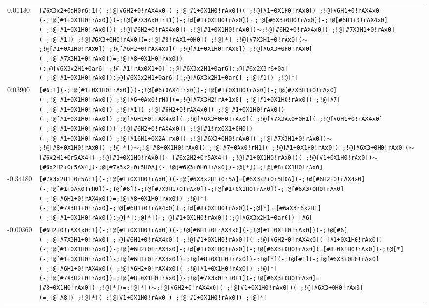 \begin{longtable}{>{\baselineskip=10pt}p{} >{\baselineskip=10pt}p{}}
0.01180 & \texttt{[\#6X3x2+0aH0r6:1](-;!@[\#6H2+0!rAX4x0](-;!@[\#1+0X1H0!rAx0])(-;!@[\#1+0X1H0!rAx0])-;!@[\#6H1+0!rAX4x0](-;!@[\#1+0X1H0!rAx0])(-;!@[\#7X3Ax0!rH1](-;!@[\#1+0X1H0!rAx0])$\sim$;!@[\#6X3+0H0!rAx0](-;!@[\#6H1+0!rAX4x0](-;!@[\#1+0X1H0!rAx0])(-;!@[\#6H2+0!rAX4x0](-;!@[\#1+0X1H0!rAx0])$\sim$;!@[\#6H2+0!rAX4x0])-;!@[\#7X3H1+0!rAx0](-;!@[\#1])-;!@[\#6X3+0H0!rAx0])=;!@[\#8!rAX1+0H0])-;!@[*]-;!@[\#7X3H1+0!rAx0]($\sim$;!@[\#1+0X1H0!rAx0])-;!@[\#6H2+0!rAX4x0](-;!@[\#1+0X1H0!rAx0])-;!@[\#6X3+0H0!rAx0](-;!@[\#7X3H1+0!rAx0])=;!@[\#8+0X1H0!rAx0])(:;@[\#6X3x2H1+0ar6]-;!@[\#1!rAx0X1+0]):;@[\#6X3x2H1+0ar6]:;@[\#6x2X3r6+0a](-;!@[\#1+0X1H0!rAx0]):;@[\#6X3x2H1+0ar6](:;@[\#6X3x2H1+0ar6]-;!@[\#1])-;!@[*]} \\ 
0.03900 & \texttt{[\#6:1](-;!@[\#1+0X1H0!rAx0])(-;!@[\#6+0AX4!rx0](-;!@[\#1+0X1H0!rAx0])-;!@[\#7X3H1+0!rAx0](-;!@[\#1+0X1H0!rAx0])-;!@[\#6+0Ax0!rH0](=;!@[\#7X3H2!rA+1x0]-;!@[\#1+0X1H0!rAx0])-;!@[\#7](-;!@[\#1+0X1H0!rAx0])-;!@[\#1])-;!@[\#6H2+0!rAX4x0](-;!@[\#1+0X1H0!rAx0])(-;!@[\#1+0X1H0!rAx0])-;!@[\#6H1+0!rAX4x0](-;!@[\#6X3+0H0!rAx0](-;!@[\#7X3Ax0+0H1](-;!@[\#6H1+0!rAX4x0](-;!@[\#1+0X1H0!rAx0])(-;!@[\#6H2+0!rAX4x0](-;!@[\#1!rx0X1+0H0])(-;!@[\#1+0X1H0!rAx0])-;!@[\#16H1+0X2A!rx0])-;!@[\#6X3+0H0!rAx0](-;!@[\#7X3H1+0!rAx0])$\sim$;!@[\#8+0X1H0!rAx0])-;!@[*])$\sim$;!@[\#8+0X1H0!rAx0])-;!@[\#7+0Ax0!rH1](-;!@[\#1+0X1H0!rAx0])-;!@[\#6X3+0H0!rAx0]($\sim$[\#6x2H1+0r5AX4](-;!@[\#1+0X1H0!rAx0])(-[\#6x2H2+0r5AX4](-;!@[\#1+0X1H0!rAx0])(-;!@[\#1+0X1H0!rAx0])$\sim$[\#6x2H2+0r5AX4])-;@[\#7X3x2+0r5H0A](-;!@[\#6X3+0H0!rAx0])-;@[*])=;!@[\#8+0X1H0!rAx0]} \\ 
-0.34180 & \texttt{[\#7X3x2H1+0r5A:1](-;!@[\#1+0X1H0!rAx0])(-;@[\#6X3x2H1+0r5A]=[\#6X3x2+0r5H0A](-;!@[\#6H2+0!rAX4x0](-;!@[\#1+0Ax0!rH0])-;!@[\#6](-;!@[\#7X3H1+0!rAx0](-;!@[\#1+0X1H0!rAx0])-;!@[\#6X3+0H0!rAx0](-;!@[\#6H1+0!rAX4x0])=;!@[\#8+0X1H0!rAx0])-;!@[*](-;!@[\#7X3H1+0!rAx0]-;!@[\#6H1+0!rAX4x0])=;!@[\#8+0X1H0!rAx0])-;@[*]$\sim$[\#6aX3r6x2H1](-;!@[\#1+0X1H0!rAx0]):;@[*]:;@[*](-;!@[\#1+0X1H0!rAx0]):;@[\#6X3x2H1+0ar6])-[\#6]} \\ 
-0.00360 & \texttt{[\#6H2+0!rAX4x0:1](-;!@[\#1+0X1H0!rAx0])(-;!@[\#6H1+0!rAX4x0](-;!@[\#1+0X1H0!rAx0])(-;!@[\#6](-;!@[\#7X3H1+0!rAx0]-;!@[\#6H1+0!rAX4x0](-;!@[\#1+0X1H0!rAx0])(-;!@[\#6H2+0!rAX4x0](-[\#1+0X1H0!rAx0])(-;!@[\#1+0X1H0!rAx0])-;!@[\#6H2+0!rAX4x0]-;!@[\#1+0X1H0!rAx0])-;!@[\#6X3+0H0!rAx0](=[\#8+0X1H0!rAx0])-;!@[*](-;!@[\#1+0X1H0!rAx0])-;!@[\#6H1+0!rAX4x0])=;!@[\#8+0X1H0!rAx0])-;!@[*](-;!@[\#1])-;!@[\#6X3+0H0!rAx0](-;!@[\#6H1+0!rAX4x0](-;!@[\#6H2+0!rAX4x0](-;!@[\#1+0X1H0!rAx0])-;!@[*](-;!@[\#7X3H2+0!rAx0])=;!@[\#8+0X1H0!rAx0])-;!@[\#7X3x0!r+0H1](-;!@[\#6X3+0H0!rAx0]=[\#8+0X1H0!rAx0])-;!@[*])=;!@[*])$\sim$;!@[\#6H2+0!rAX4x0](-;!@[\#1+0X1H0!rAx0])(-;!@[\#6X3+0H0!rAx0](=;!@[\#8])-;!@[*](-;!@[\#1+0X1H0!rAx0])-;!@[\#1+0X1H0!rAx0])-;!@[*]} \\ 

\end{longtable}
